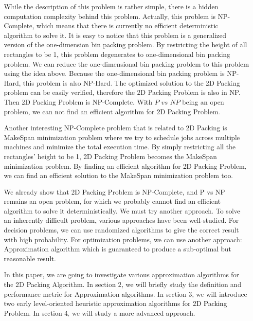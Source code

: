 \documentclass[sigplan,screen,nonacm]{acmart}\settopmatter{printfolios=true,printccs=false,printacmref=false}
\begin{document}
\par While the description of this problem is rather simple, there is a hidden computation complexity behind this problem. Actually, this problem is NP-Complete\cite{hartmanis1982computers}, which means that there is currently no efficient deterministic algorithm to solve it. It is easy to notice that this problem is a generalized version of the one-dimension bin packing problem\cite{johnson1974worst}. By restricting the height of all rectangles to be 1, this problem degenerates to one-dimensional bin packing problem. We can reduce the one-dimensional bin packing problem to this problem using the idea above. Because the one-dimensional bin packing problem is NP-Hard, this problem is also NP-Hard. The optimized solution to the 2D Packing problem can be easily verified, therefore the 2D Packing Problem is also in NP. Then 2D Packing Problem is NP-Complete. With $P$ $vs$ $NP$ being an open problem, we can not find an efficient algorithm for 2D Packing Problem. \par
Another interesting NP-Complete problem that is related to 2D Packing is MakeSpan minimization problem\cite{graham1966bounds} where we try to schedule jobs across multiple machines and minimize the total execution time. By simply restricting all the rectangles' height to be 1, 2D Packing Problem becomes the MakeSpan minimization problem. By finding an efficient algorithm for 2D Packing Problem, we can find an efficient solution to the MakeSpan minimization problem too. \par
We already show that 2D Packing Problem is NP-Complete, and P vs NP remains an open problem, for which we probably cannot find an efficient algorithm to solve it deterministically. We must try another approach. To solve an inherently difficult problem, various approaches have been well-studied. For decision problems, we can use randomized algorithms to give the correct result with high probability. For optimization problems, we can use another approach: Approximation algorithm\cite{garey1976approximation} which is guaranteed to produce a sub-optimal but reasonable result. \par
In this paper, we are going to investigate various approximation algorithms for the 2D Packing Algorithm. In section 2, we will briefly study the definition and performance metric for Approximation algorithms. In section 3, we will introduce two early level-oriented heuristic approximation algorithms\cite{coffman1980performance} for 2D Packing Problem. In section 4,  we will study a more advanced approach\cite{steinberg1997strip}.
\end{document}
